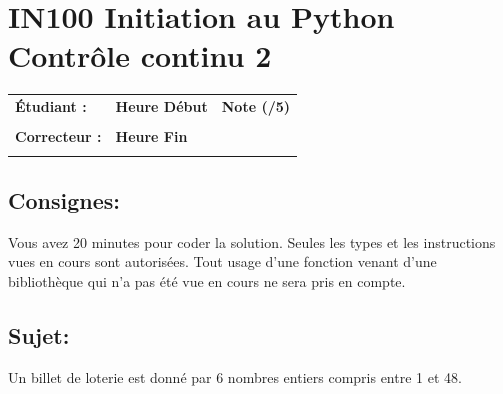 \documentclass[a4paper,11pt]{article}
\begin{document}
\newtheorem{theo}{Theorem}
\newtheorem{coro}{Corollary}[theo]
\newtheorem{lemme}{Lemma}
\renewcommand{\thecoro}{\thetheo.\arabic{coro}}



\parindent=0cm


\section*{\center IN100 Initiation au Python\\
Contrôle continu 2}

\vspace{1 cm}

\begin{table}[h!]
\centering
\renewcommand{\arraystretch}{1.4} %
\begin{tabular}{|p{10cm}|p{3cm}|p{2cm}|}
\hline
\textbf{Étudiant :} & \textbf{Heure Début }  & \textbf{Note (/5) }  \\
& & \\
\hline
\textbf{Correcteur :} & \textbf{Heure Fin } & \\
& & \\
\hline

\hline
\end{tabular}
\end{table}

\vspace{-0.5 cm}

\subsection*{Consignes:} Vous avez 20 minutes pour coder la solution. Seules les types et les instructions vues en cours sont autorisées. Tout usage d'une fonction 
venant d'une bibliothèque qui n'a pas été vue en cours ne sera pris en compte. 

\vspace{-0.3 cm}
\subsection*{Sujet:}

Un billet de loterie est donné par 6 nombres entiers compris entre 1 et 48. 
\end{document}
